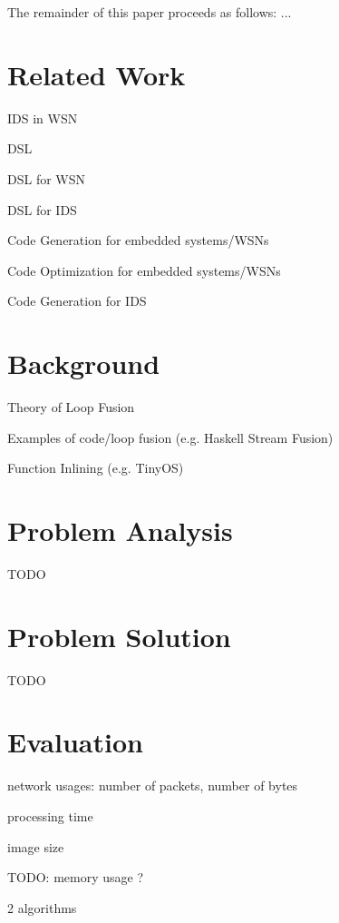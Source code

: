 \documentclass[conference]{IEEEtran}
\begin{document}
The remainder of this paper proceeds as follows: ...

\section{Related Work}

IDS in WSN \cite{perrig2004security,mishra2004intrusion}

DSL \cite{fowler2010domain,mernik2005and}

DSL for WSN \cite{naumowicz2009prototyping,levis2004tinyscript}

DSL for IDS \cite{eckmann2002statl}

Code Generation for embedded systems/WSNs \cite{leupers2000code,marwedel2002code}

Code Optimization for embedded systems/WSNs \cite{panda2001data,naik2001software}

Code Generation for IDS \cite{charitakis2003code}

\section{Background}

Theory of Loop Fusion \cite{darte2000complexity}

Examples of code/loop fusion (e.g. Haskell Stream Fusion) \cite{coutts2007stream}

Function Inlining (e.g. TinyOS) \cite{gay2007software,gay2003nesc}

\section{Problem Analysis}

TODO

\section{Problem Solution}

TODO

\section{Evaluation}

network usages: number of packets, number of bytes

processing time

image size

TODO: memory usage ?

2 algorithms \cite{ganeriwal2008reputation}
\end{document}
